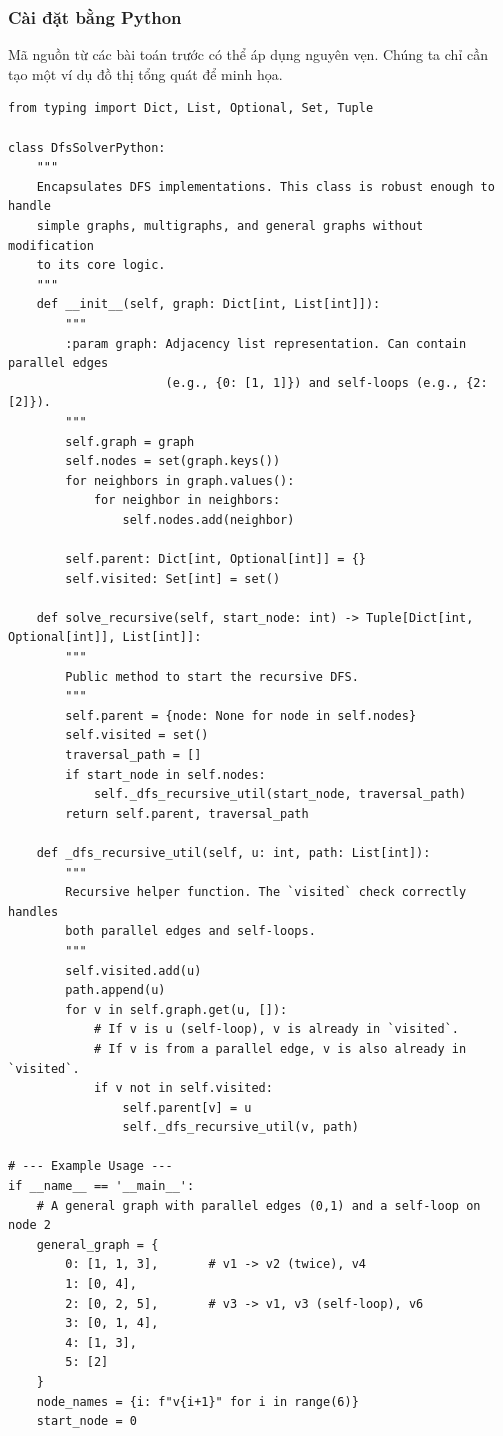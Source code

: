 \documentclass[a4paper,12pt]{article}
\begin{document}
\subsubsection{Cài đặt bằng Python }
Mã nguồn từ các bài toán trước có thể áp dụng nguyên vẹn. Chúng ta chỉ cần tạo một ví dụ đồ thị tổng quát để minh họa.
\begin{lstlisting}[style=pythonstyle, caption={Cài đặt DFS cho đồ thị tổng quát trong Python.}, label={lst:python_dfs_13}]
from typing import Dict, List, Optional, Set, Tuple

class DfsSolverPython:
    """
    Encapsulates DFS implementations. This class is robust enough to handle
    simple graphs, multigraphs, and general graphs without modification
    to its core logic.
    """
    def __init__(self, graph: Dict[int, List[int]]):
        """
        :param graph: Adjacency list representation. Can contain parallel edges
                      (e.g., {0: [1, 1]}) and self-loops (e.g., {2: [2]}).
        """
        self.graph = graph
        self.nodes = set(graph.keys())
        for neighbors in graph.values():
            for neighbor in neighbors:
                self.nodes.add(neighbor)
        
        self.parent: Dict[int, Optional[int]] = {}
        self.visited: Set[int] = set()

    def solve_recursive(self, start_node: int) -> Tuple[Dict[int, Optional[int]], List[int]]:
        """
        Public method to start the recursive DFS.
        """
        self.parent = {node: None for node in self.nodes}
        self.visited = set()
        traversal_path = []
        if start_node in self.nodes:
            self._dfs_recursive_util(start_node, traversal_path)
        return self.parent, traversal_path

    def _dfs_recursive_util(self, u: int, path: List[int]):
        """
        Recursive helper function. The `visited` check correctly handles
        both parallel edges and self-loops.
        """
        self.visited.add(u)
        path.append(u)
        for v in self.graph.get(u, []):
            # If v is u (self-loop), v is already in `visited`.
            # If v is from a parallel edge, v is also already in `visited`.
            if v not in self.visited:
                self.parent[v] = u
                self._dfs_recursive_util(v, path)

# --- Example Usage ---
if __name__ == '__main__':
    # A general graph with parallel edges (0,1) and a self-loop on node 2
    general_graph = {
        0: [1, 1, 3],       # v1 -> v2 (twice), v4
        1: [0, 4],
        2: [0, 2, 5],       # v3 -> v1, v3 (self-loop), v6
        3: [0, 1, 4],
        4: [1, 3],
        5: [2]
    }
    node_names = {i: f"v{i+1}" for i in range(6)}
    start_node = 0


\end{lstlisting}
\end{document}
